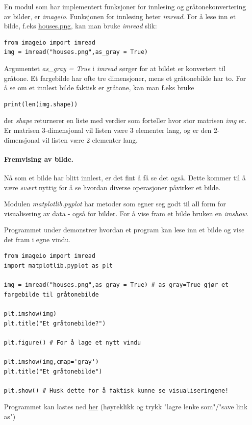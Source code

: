 \documentclass[%
oneside,                 %
final,                   %
10pt]{article}
\begin{document}
\vspace{3mm}


En modul som har implementert funksjoner for innlesing og gråtonekonvertering av bilder, er \emph{imageio}.
Funksjonen for innlesing heter \emph{imread}. For å lese inn et bilde, f.eks \href{{https://github.com/krisbhei/INF2310/raw/master/Programmering/Python/houses.png}}{houses.png}, kan man bruke \emph{imread} slik:
\begin{verbatim}
from imageio import imread
img = imread("houses.png",as_gray = True)
\end{verbatim}

Argumentet \emph{as\_gray = True} i \emph{imread} sørger for at bildet er konvertert til gråtone. Et fargebilde har ofte tre dimensjoner, mens et gråtonebilde har to.
For å se om et innlest bilde faktisk er gråtone, kan man f.eks bruke
\begin{verbatim}
print(len(img.shape))
\end{verbatim}
der \emph{shape} returnerer en liste med verdier som forteller hvor stor matrisen \emph{img} er. Er matrisen 3-dimensjonal vil listen være 3 elementer lang, og er den 2-dimensjonal vil listen være 2 elementer lang.

\paragraph{Fremvising av bilde.}
Nå som et bilde har blitt innlest, er det fint å få se det også. Dette kommer til å være \emph{svært} nyttig for å se hvordan diverse operasjoner påvirker et bilde.

Modulen \emph{matplotlib.pyplot} har metoder som egner seg godt til all form for visualisering av data - også for bilder. For å vise fram et bilde bruken en \emph{imshow}.

Programmet under demonstrer hvordan et program kan lese inn et bilde og vise det fram i egne vindu.
\begin{verbatim}
from imageio import imread
import matplotlib.pyplot as plt

img = imread("houses.png",as_gray = True) # as_gray=True gjør et fargebilde til gråtonebilde

plt.imshow(img)
plt.title("Et gråtonebilde?")

plt.figure() # For å lage et nytt vindu

plt.imshow(img,cmap='gray')
plt.title("Et gråtonebilde")

plt.show() # Husk dette for å faktisk kunne se visualiseringene!
\end{verbatim}
Programmet kan lastes ned \href{{https://github.com/krisbhei/INF2310/raw/master/Programmering/Python/fremvising.py}}{her} (høyreklikk og trykk "lagre lenke som"/"save link as")
\end{document}
